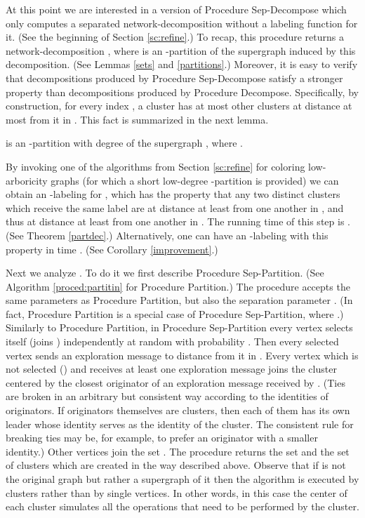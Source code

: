 \documentclass[11pt]{article}
\begin{document}
At this point we are interested in a version of Procedure Sep-Decompose which only computes a separated network-decomposition without a labeling function for it. (See the beginning of Section \ref{sc:refine}.) To recap, this procedure returns a network-decomposition , where  is an -partition of the supergraph  induced by this decomposition. (See Lemmas \ref{sets} and \ref{partitions}.) Moreover, it is easy to verify that decompositions  produced by Procedure Sep-Decompose satisfy a stronger property than decompositions produced by Procedure Decompose. Specifically, by construction, for every index , a cluster  has at most  other clusters  at distance at most  from it in . This fact is summarized in the next lemma.
\begin{lem} \label{partitionofgraph}
 is an -partition with degree  of the supergraph , where .
\end{lem}
By invoking one of the algorithms from Section \ref{sc:refine} for coloring low-arboricity graphs (for which a short low-degree -partition is provided) we can obtain an -labeling for , which has the property that any two distinct clusters  which receive the same label are at distance at least  from one another in , and thus at distance at least  from one another in . The running time of this step is . (See Theorem \ref{partdec}.) Alternatively, one can have an -labeling with this property in time . (See Corollary \ref{improvement}.)

Next we analyze . To do it we first describe Procedure Sep-Partition. (See Algorithm \ref{proced:partitin} for Procedure Partition.) The procedure accepts the same parameters as Procedure Partition, but also the separation parameter . (In fact, Procedure Partition is a special case of Procedure Sep-Partition, where .) Similarly to Procedure Partition, in Procedure Sep-Partition every vertex  selects itself (joins ) independently at random with probability . Then every selected vertex  sends an exploration message to distance  from it in . Every vertex  which is not selected () and receives at least one exploration message joins the cluster centered by the closest originator of an exploration message received by . (Ties are broken in an arbitrary but consistent way according to the identities of originators. If originators themselves are clusters, then each of them has its own leader whose identity serves as the identity of the cluster. The consistent rule for breaking ties may be, for example, to prefer an originator with a smaller identity.) Other vertices join the set . The procedure returns the set  and the set  of clusters which are created in the way described above. Observe that if  is not the original graph but rather a supergraph of it then the algorithm is executed by clusters rather than by single vertices. In other words, in this case the center of each cluster simulates all the operations that need to be performed by the cluster.
\end{document}
